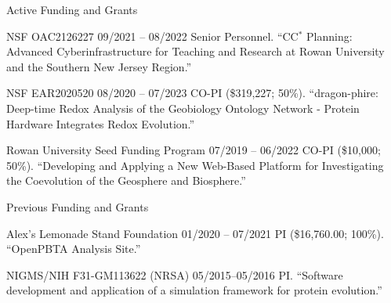 \documentclass{resume} %
\begin{document}
\vspace*{0.35cm}
\begin{rSection}{Active Funding and Grants}
\vspace*{0.25cm}

\begin{rSubsection}
  {NSF OAC2126227}
  {09/2021 -- 08/2022}
  {Senior Personnel. ``CC$^\ast$ Planning: Advanced Cyberinfrastructure for Teaching and Research at Rowan University and the Southern New Jersey Region.''}
\end{rSubsection}


\begin{rSubsection}
  {NSF EAR2020520}
  {08/2020 -- 07/2023}
  {CO-PI (\$319,227; 50\%). ``dragon-phire: Deep-time Redox Analysis of the Geobiology Ontology Network - Protein Hardware Integrates Redox Evolution.''}
\end{rSubsection}

\begin{rSubsection}
  {Rowan University Seed Funding Program}
  {07/2019 -- 06/2022}
  {CO-PI (\$10,000; 50\%). ``Developing and Applying a New Web-Based Platform for Investigating the Coevolution of the Geosphere and Biosphere.''}
\end{rSubsection}





\end{rSection}



\vspace*{0.35cm}
\begin{rSection}{Previous Funding and Grants}
\vspace*{0.25cm}

\begin{rSubsection}
  {Alex's Lemonade Stand Foundation}
  {01/2020 -- 07/2021}
  {PI (\$16,760.00; 100\%). ``OpenPBTA Analysis Site.''}
\end{rSubsection}



\begin{rSubsection}
  {NIGMS/NIH F31-GM113622 (NRSA)}
  {05/2015--05/2016}
  {PI. ``Software development and application of a simulation framework for protein evolution.''}
\end{rSubsection}

\end{rSection}
\end{document}
